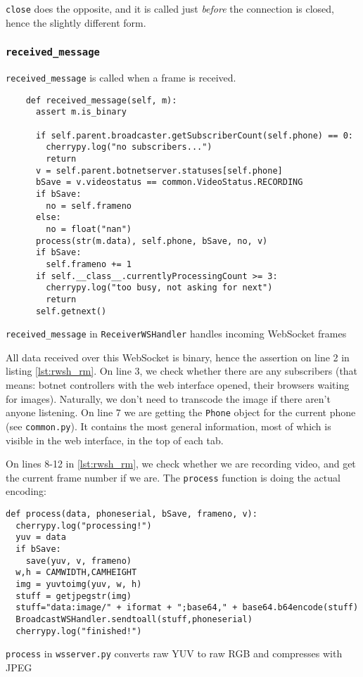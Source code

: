 \documentclass[a4paper]{report}
\newcommand{\classname}[1]{\texttt{#1}}
\newcommand{\methodname}[1]{\texttt{#1}}
\newcommand{\filename}[1]{\texttt{#1}}
\begin{document}
\methodname{close} does the opposite, and it is called just \emph{before} the connection is closed, hence the slightly different form.

\subsubsection{\methodname{received\_message}}
\methodname{received\_message} is called when a frame is received.

\begin{listing}[H]
\begin{verbatim}
    def received_message(self, m):
      assert m.is_binary
      
      if self.parent.broadcaster.getSubscriberCount(self.phone) == 0:
        cherrypy.log("no subscribers...")
        return
      v = self.parent.botnetserver.statuses[self.phone]
      bSave = v.videostatus == common.VideoStatus.RECORDING
      if bSave:
        no = self.frameno
      else:
        no = float("nan")
      process(str(m.data), self.phone, bSave, no, v)
      if bSave:
        self.frameno += 1
      if self.__class__.currentlyProcessingCount >= 3:
        cherrypy.log("too busy, not asking for next")
        return
      self.getnext()
\end{verbatim}
\caption{\methodname{received\_message} in \classname{ReceiverWSHandler} handles incoming WebSocket frames}
\label{lst:rwsh_rm}
\end{listing}

All data received over this WebSocket is binary, hence the assertion on line 2 in listing \ref{lst:rwsh_rm}. On line 3, we check whether there are any subscribers (that means: botnet controllers with the web interface opened, their browsers waiting for images). Naturally, we don't need to transcode the image if there aren't anyone listening. On line 7 we are getting the \classname{Phone} object for the current phone (see \filename{common.py}). It contains the most general information, most of which is visible in the web interface, in the top of each tab.

On lines 8-12 in \ref{lst:rwsh_rm}, we check whether we are recording video, and get the current frame number if we are. The \methodname{process} function is doing the actual encoding:

\begin{listing}[H]
\begin{verbatim}
def process(data, phoneserial, bSave, frameno, v):
  cherrypy.log("processing!")
  yuv = data
  if bSave:
    save(yuv, v, frameno)
  w,h = CAMWIDTH,CAMHEIGHT
  img = yuvtoimg(yuv, w, h)
  stuff = getjpegstr(img)
  stuff="data:image/" + iformat + ";base64," + base64.b64encode(stuff)
  BroadcastWSHandler.sendtoall(stuff,phoneserial)
  cherrypy.log("finished!")
\end{verbatim}
\caption{\methodname{process} in \filename{wsserver.py} converts raw YUV to raw RGB and compresses with JPEG}
\label{lst:process}
\end{listing}
\end{document}
